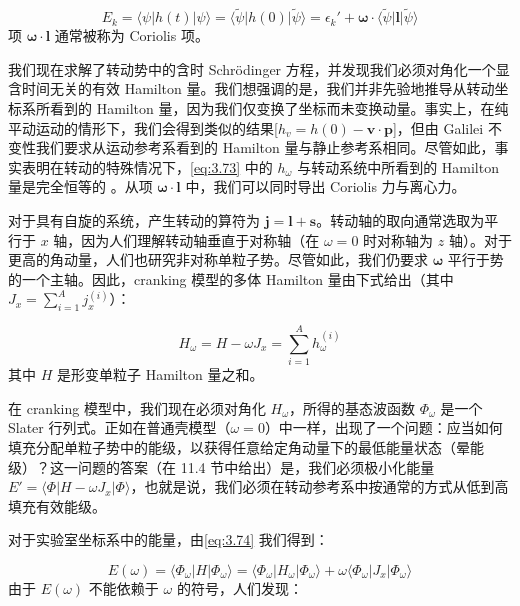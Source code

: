 \begin{equation}
E_{k}=\langle\psi|h(t)|\psi\rangle=\langle\tilde{\psi}|h(0)|\tilde{\psi}\rangle=\epsilon_{k}'+\boldsymbol{\omega}\cdot\langle\tilde{\psi}|\boldsymbol{l}|\tilde{\psi}\rangle\label{eq:3.74}
\end{equation}
项 $\boldsymbol{\omega}\cdot\boldsymbol{l}$ 通常被称为 Coriolis 项。

我们现在求解了转动势中的含时 Schrödinger 方程，并发现我们必须对角化一个显含时间无关的有效 Hamilton 量。我们想强调的是，我们并非先验地推导从转动坐标系所看到的
Hamilton 量，因为我们仅变换了坐标而未变换动量。事实上，在纯平动运动的情形下，我们会得到类似的结果{[}$h_{v}=h(0)-\boldsymbol{v}\cdot\boldsymbol{p}${]}，但由
Galilei 不变性我们要求从运动参考系看到的 Hamilton 量与静止参考系相同。尽管如此，事实表明在转动的特殊情况下，\ref{eq:3.73}
中的 $h_{\omega}$ 与转动系统中所看到的 Hamilton 量是完全恒等的 \cite[第 69 页]{Va56,Br64}。从项
$\boldsymbol{\omega}\cdot\boldsymbol{l}$ 中，我们可以同时导出 Coriolis 力与离心力。

对于具有自旋的系统，产生转动的算符为 $\boldsymbol{j}=\boldsymbol{l}+\boldsymbol{s}$。转动轴的取向通常选取为平行于
$x$ 轴，因为人们理解转动轴垂直于对称轴（在 $\omega=0$ 时对称轴为 $z$ 轴）。对于更高的角动量，人们也研究非对称单粒子势。尽管如此，我们仍要求
$\boldsymbol{\omega}$ 平行于势的一个主轴。因此，cranking 模型的多体 Hamilton 量由下式给出（其中
$J_{x}=\sum^{A}_{i=1}j^{(i)}_{x}$）：

\begin{equation}
H_{\omega}=H-\omega J_{x}=\sum^{A}_{i=1}h^{(i)}_{\omega}\label{eq:3.75}
\end{equation}
其中 $H$ 是形变单粒子 Hamilton 量之和。

在 cranking 模型中，我们现在必须对角化 $H_{\omega}$，所得的基态波函数 $\Phi_{\omega}$ 是一个
Slater 行列式。正如在普通壳模型（$\omega=0$）中一样，出现了一个问题：应当如何填充分配单粒子势中的能级，以获得任意给定角动量下的最低能量状态（晕能级）？这一问题的答案（在
11.4 节中给出）是，我们必须极小化能量 $E'=\langle\Phi|H-\omega J_{x}|\Phi\rangle$，也就是说，我们必须在转动参考系中按通常的方式从低到高填充有效能级。

对于实验室坐标系中的能量，由\ref{eq:3.74} 我们得到：

\begin{equation}
E(\omega)=\langle\Phi_{\omega}|H|\Phi_{\omega}\rangle=\langle\Phi_{\omega}|H_{\omega}|\Phi_{\omega}\rangle+\omega\langle\Phi_{\omega}|J_{x}|\Phi_{\omega}\rangle\label{eq:3.76}
\end{equation}
由于 $E(\omega)$ 不能依赖于 $\omega$ 的符号，人们发现：

